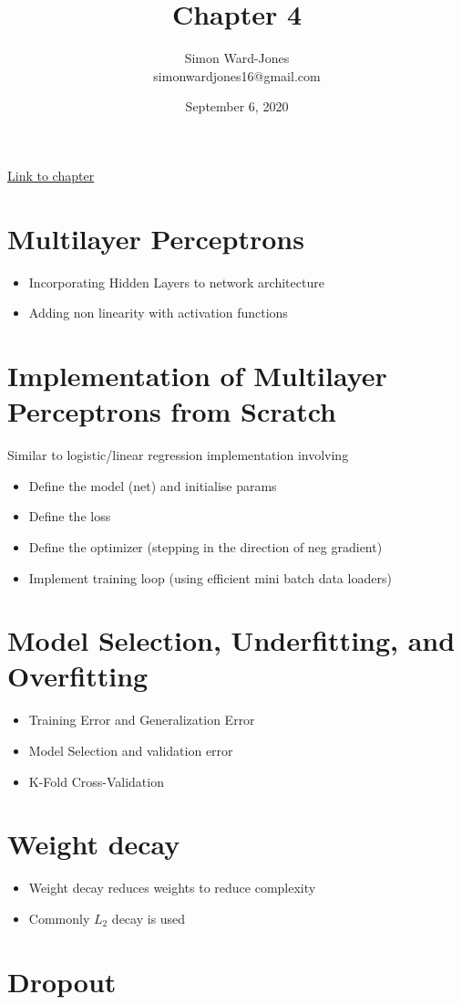 \documentclass[12pt,notitlepage]{article}
\begin{document}


\title{\Large{\textbf{Chapter 4}}}
\date{September 6, 2020}
\author{Simon Ward-Jones\\simonwardjones16@gmail.com}

\maketitle
\href{https://d2l.ai/chapter_multilayer-perceptrons/index.html}{Link to chapter}

\section{Multilayer Perceptrons}
\begin{itemize}
    \item Incorporating Hidden Layers to network architecture
    \item Adding non linearity with activation functions
\end{itemize}

\section{Implementation of Multilayer Perceptrons from Scratch}
Similar to logistic/linear regression implementation involving
\begin{itemize}
    \item Define the model (net) and initialise params
    \item Define the loss
    \item Define the optimizer (stepping in the direction of neg gradient)
    \item Implement training loop (using efficient mini batch data loaders)
\end{itemize}


\section{Model Selection, Underfitting, and Overfitting}
\begin{itemize}
    \item Training Error and Generalization Error
    \item Model Selection and validation error
    \item K-Fold Cross-Validation
\end{itemize}

\section{Weight decay}
\begin{itemize}
    \item Weight decay reduces weights to reduce complexity
    \item Commonly $L_2$ decay is used 
\end{itemize}

\section{Dropout}


\vfill

\nocite{zhang2020dive}
\end{document}
